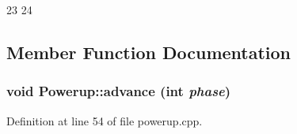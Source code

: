 \begin{DoxyCode}
23 {
24 }
\end{DoxyCode}


\subsection{Member Function Documentation}
\hypertarget{class_powerup_a02fc102081ea4cbbccdbb77f1c4fd00a}{
\subsubsection[{advance}]{\setlength{\rightskip}{0pt plus 5cm}void Powerup::advance (int {\em phase})}}
\label{class_powerup_a02fc102081ea4cbbccdbb77f1c4fd00a}


Definition at line 54 of file powerup.cpp.


